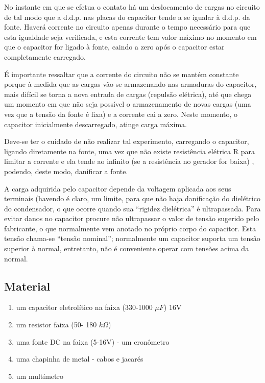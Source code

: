 \documentclass[a4paper,12pt]{article}
\begin{document}
No instante em que se efetua o contato há um deslocamento de cargas no circuito de tal modo que a d.d.p. nas placas do capacitor tende a se igualar à d.d.p. da fonte. Haverá corrente no circuito apenas durante o tempo necessário para que esta igualdade seja verificada, e esta corrente tem valor máximo no momento em que o capacitor for ligado à fonte, caindo a zero após o capacitor estar completamente carregado. 

\vspace{5.0ex} 
É importante ressaltar que a corrente do circuito não se mantém constante porque à medida que as cargas vão se armazenando nas armaduras do capacitor, mais difícil se torna a nova entrada de cargas (repulsão elétrica), até que chega um momento em que não seja possível o armazenamento de novas cargas (uma vez que a tensão da fonte é fixa) e a corrente cai a zero. Neste momento, o capacitor inicialmente descarregado, atinge carga máxima.

 \vspace{5.0ex}
Deve-se ter o cuidado de não realizar tal experimento, carregando o capacitor, ligando diretamente na fonte, uma vez que não existe resistência elétrica R para limitar a corrente e ela tende ao infinito (se a resistência no gerador for baixa) , podendo, deste modo, danificar a fonte.

\vspace{5.0ex}

A carga adquirida pelo capacitor depende da voltagem aplicada aos seus terminais (havendo é claro, um limite, para que não haja danificação do dielétrico do condensador, o que ocorre quando sua “rigidez dielétrica” é ultrapassada. Para evitar danos no capacitor procure não ultrapassar o valor de tensão sugerido pelo fabricante, o que normalmente vem anotado no próprio corpo do capacitor. Esta tensão chama-se “tensão nominal”; normalmente um capacitor suporta um tensão superior à normal, entretanto, não é conveniente operar com tensões acima da normal.



 
\subsection{Material}
\begin{enumerate} 
\item { um capacitor eletrolítico na faixa (330-1000 $\mu F$) 16V }
\item {um resistor faixa (50- 180 $k\Omega$) }
\item { uma fonte DC na faixa (5-16V) - um cronômetro }
\item { uma chapinha de metal - cabos e jacarés }
\item {um multímetro }
\end{enumerate}
\end{document}
